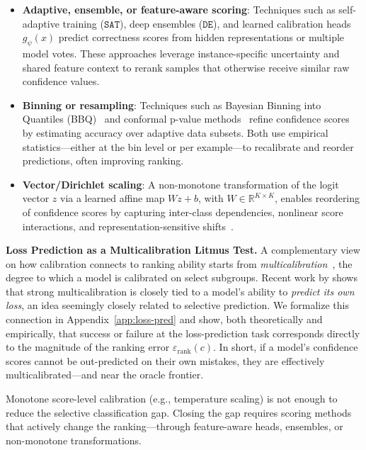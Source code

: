 \begin{itemize}
    \item \textbf{Adaptive, ensemble, or feature-aware scoring}:  
          Techniques such as self-adaptive training (\(\texttt{SAT}\)), deep ensembles (\(\texttt{DE}\)), and learned calibration heads \(g_\psi(x)\) predict correctness scores from hidden representations or multiple model votes. These approaches leverage instance-specific uncertainty and shared feature context to rerank samples that otherwise receive similar raw confidence values.
          
\item \textbf{Binning or resampling}:  
      Techniques such as Bayesian Binning into Quantiles (BBQ)~\citep{naeini2015obtaining} and conformal p-value methods~\citep{angelopoulos2021gentle} refine confidence scores by estimating accuracy over adaptive data subsets. Both use empirical statistics—either at the bin level or per example—to recalibrate and reorder predictions, often improving ranking.

\item \textbf{Vector/Dirichlet scaling}:  
      A non-monotone transformation of the logit vector \(z\) via a learned affine map \(Wz + b\), with \(W \in \mathbb{R}^{K \times K}\), enables reordering of confidence scores by capturing inter-class dependencies, nonlinear score interactions, and representation-sensitive shifts~\citep{kull2019beyond}.

\end{itemize}

\textbf{Loss Prediction as a Multicalibration Litmus Test.}
A complementary view on how calibration connects to ranking ability starts from \emph{multicalibration}~\citep{hebert2018multicalibration},
the degree to which a model is calibrated on select subgroups. Recent work by \citet{gollakota2025loss} shows that strong multicalibration is closely tied to a model's ability to \emph{predict its own loss}, an idea seemingly closely related to selective prediction. We formalize this connection in Appendix~\ref{app:loss-pred} and show, both theoretically and empirically, that success or failure at the loss-prediction task corresponds directly to the magnitude of the ranking error \(\varepsilon_{\text{rank}}(c)\). In short, if a model's confidence scores cannot be out-predicted on their own mistakes, they are effectively multicalibrated—and near the oracle frontier.

\begin{takeaway}
Monotone score-level calibration (e.g., temperature scaling) is not enough to reduce the selective classification gap. Closing the gap requires scoring methods that actively change the ranking—through feature-aware heads, ensembles, or non-monotone transformations.
\end{takeaway}


